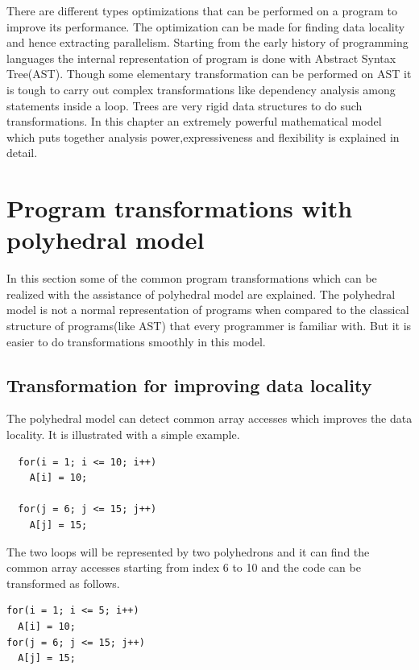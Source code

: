 \label{chap:background}

There are different types optimizations that can be performed on a program to improve its
performance. The optimization can be made for finding data locality and hence extracting
parallelism. Starting from the early history of programming languages the internal representation
of program is done with Abstract Syntax Tree(AST). Though some elementary transformation can
be performed on AST it is tough to carry out complex transformations like dependency analysis among
statements inside a loop. Trees are very rigid data structures to do such transformations.
In this chapter an extremely powerful mathematical model which puts together analysis power,expressiveness and flexibility is explained in detail.

\section{Program transformations with polyhedral model}

In this section some of the common program transformations which can be realized with the
assistance of polyhedral model are explained. The polyhedral model is not a normal
representation of programs when compared to the
classical structure of programs(like AST) that every programmer is familiar with. But
it is easier to do transformations smoothly in this model.

\subsection{Transformation for improving data locality}

The polyhedral model can detect common array accesses which improves the data locality. It is
illustrated with a simple example.
{\footnotesize
\begin{lstlisting}
  for(i = 1; i <= 10; i++)
    A[i] = 10;
  
  for(j = 6; j <= 15; j++)
    A[j] = 15;
\end{lstlisting}
}

The two loops will be represented by two polyhedrons and it can find the common 
array accesses starting from index 6 to 10 and the code can be transformed as follows.

{\footnotesize
\begin{lstlisting}
for(i = 1; i <= 5; i++)
  A[i] = 10;
for(j = 6; j <= 15; j++)
  A[j] = 15;
\end{lstlisting}
}


